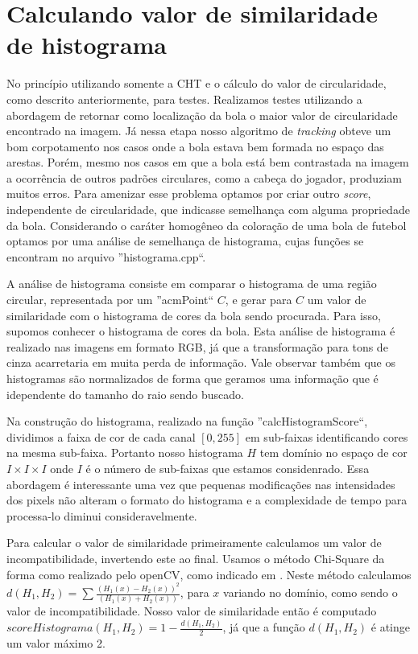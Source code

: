 \documentclass[11pt,a4paper]{article}
\begin{document}
\section{Calculando valor de similaridade de histograma}

 No princípio utilizando somente a CHT e o cálculo do valor de circularidade, como descrito anteriormente, para testes. Realizamos testes utilizando a abordagem de retornar como localização da bola o maior valor de circularidade encontrado na imagem. Já nessa etapa nosso algoritmo de \textit{tracking} obteve um bom corpotamento nos casos onde a bola estava bem formada no espaço das arestas. Porém, mesmo nos casos em que a bola está bem contrastada na imagem a ocorrência de outros padrões circulares, como a cabeça do jogador, produziam muitos erros. Para amenizar esse problema optamos por criar outro \textit{score}, independente de circularidade, que indicasse semelhança com alguma propriedade da bola. Considerando o caráter homogêneo da coloração de uma bola de futebol optamos por uma análise de semelhança de histograma, cujas funções se encontram no arquivo ''histograma.cpp``.

 A análise de histograma consiste em comparar o histograma de uma região circular, representada por um ''acmPoint`` $C$, e gerar para $C$ um valor de similaridade com o histograma de cores da bola sendo procurada. Para isso, supomos conhecer o histograma de cores da bola. Esta análise de histograma é realizado nas imagens em formato RGB, já que a transformação para tons de cinza acarretaria em muita perda de informação. Vale observar também que os histogramas são normalizados de forma que geramos uma informação que é idependente do tamanho do raio sendo buscado.

 Na construção do histograma, realizado na função ''calcHistogramScore``, dividimos a faixa de cor de cada canal $[0,255]$ em sub-faixas identificando cores na mesma sub-faixa. Portanto nosso histograma $H$ tem domínio no espaço de cor $I\times I\times I$ onde $I$ é o número de sub-faixas que estamos considenrado. Essa abordagem é interessante uma vez que pequenas modificações nas intensidades dos pixels não alteram o formato do histograma e a complexidade de tempo para processa-lo diminui consideravelmente.

 Para calcular o valor de similaridade primeiramente calculamos um valor de incompatibilidade, invertendo este ao final. Usamos o método Chi-Square da forma como realizado pelo openCV, como indicado em \cite{}. Neste método calculamos $d(H_1,H_2) = \sum{\frac{(H_1(x) - H_2(x))^2}{(H_1(x) + H_2(x))} }$, para $x$ variando no domínio, como sendo o valor de incompatibilidade. Nosso valor de similaridade então é computado $scoreHistograma(H_1,H_2) = 1 - \frac{d(H_1,H_2)}{2}$, já que a função $d(H_1,H_2)$ é atinge um valor máximo 2.
\end{document}
